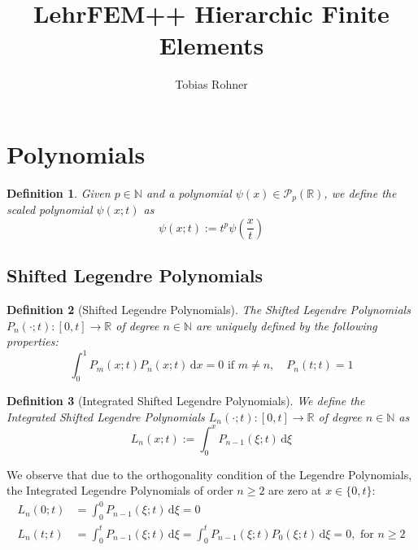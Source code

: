 \documentclass[10pt,a4paper]{article}
\author{Tobias Rohner}
\title{LehrFEM++ Hierarchic Finite Elements}
\newtheorem{defn}{Definition}
\begin{document}
    
\maketitle

\section{Polynomials}

    \begin{defn}
        Given $p \in \mathbb{N}$ and a polynomial $\psi(x) \in \mathcal{P}_p(\mathbb{R})$, we define the scaled polynomial $\psi(x;t)$ as
        \begin{equation*}
            \psi(x;t) := t^p\psi\left(\frac{x}{t}\right)
        \end{equation*}
    \end{defn}


\subsection{Shifted Legendre Polynomials}

    \begin{defn}[Shifted Legendre Polynomials]
        The Shifted Legendre Polynomials $P_n(\cdot;t) : [0, t] \to \mathbb{R}$ of degree $n \in \mathbb{N}$ are uniquely defined by the following properties:
        \begin{equation*}
            \int_0^1\! P_m(x;t)P_n(x;t) \,\mathrm{d}x = 0 \mbox{ if } m \neq n, \quad P_n(t;t) = 1
        \end{equation*}
    \end{defn}

    \begin{defn}[Integrated Shifted Legendre Polynomials]
        We define the Integrated Shifted Legendre Polynomials $L_n(\cdot;t) : [0, t] \to \mathbb{R}$ of degree $n \in \mathbb{N}$ as
        \begin{equation*}
            L_n(x;t) := \int_0^x\! P_{n-1}(\xi;t) \,\mathrm{d}\xi
        \end{equation*}
    \end{defn}

    We observe that due to the orthogonality condition of the Legendre Polynomials, the Integrated Legendre Polynomials of order $n \geq 2$ are zero at $x \in \{0, t\}$:
    \begin{align*}
        L_n(0;t) &= \int_0^0\! P_{n-1}(\xi;t) \,\mathrm{d}\xi = 0 \\
        L_n(t;t) &= \int_0^t\! P_{n-1}(\xi;t) \,\mathrm{d}\xi = \int_0^t\! P_{n-1}(\xi;t)P_0(\xi;t) \,\mathrm{d}\xi = 0, \mbox{ for } n \geq 2
    \end{align*}
    
\end{document}
